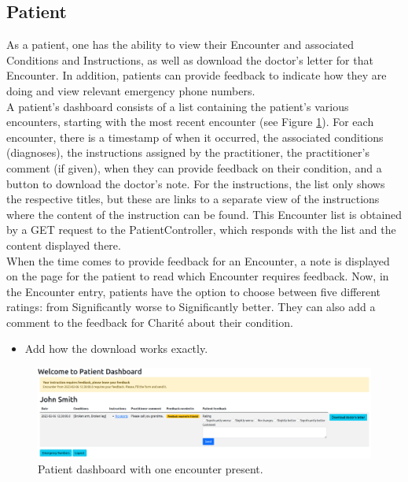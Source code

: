 \documentclass[]{report}
\begin{document}
\subsection{Patient}
As a patient, one has the ability to view their Encounter and associated Conditions and Instructions, as well as download the doctor's letter for that Encounter. In addition, patients can provide feedback to indicate how they are doing and view relevant emergency phone numbers.\\
A patient's dashboard consists of a list containing the patient's various encounters, starting with the most recent encounter (see Figure \ref{fig:patient_dashboard}). For each encounter, there is a timestamp of when it occurred, the associated conditions (diagnoses), the instructions assigned by the practitioner, the practitioner's comment (if given), when they can provide feedback on their condition, and a button to download the doctor's note. For the instructions, the list only shows the respective titles, but these are links to a separate view of the instructions where the content of the instruction can be found. This Encounter list is obtained by a GET request to the PatientController, which responds with the list and the content displayed there.\\
When the time comes to provide feedback for an Encounter, a note is displayed on the page for the patient to read which Encounter requires feedback. Now, in the Encounter entry, patients have the option to choose between five different ratings: from Significantly worse to Significantly better. They can also add a comment to the feedback for Charité about their condition.
\begin{itemize}
    \item Add how the download works exactly.
\end{itemize}

\begin{figure}[h]
    \centering
    \includegraphics[width=1\textwidth]{Patient_Dashboard.png}
    \caption{Patient dashboard with one encounter present.}
    \label{fig:patient_dashboard}
\end{figure}
\end{document}
